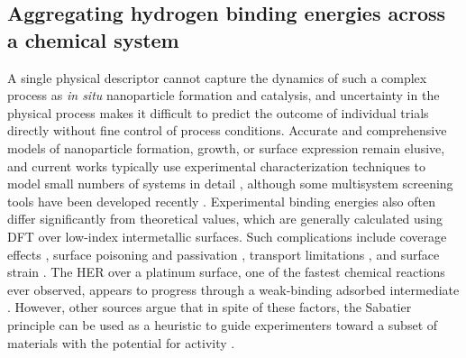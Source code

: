 \documentclass[preprint,12pt]{elsarticle}
\begin{document}
\subsection{Aggregating hydrogen binding energies across a chemical system}
A single physical descriptor cannot capture the dynamics of such a complex process as {\it in situ} nanoparticle formation and catalysis, and uncertainty in the physical process makes it difficult to predict the outcome of individual trials directly without fine control of process conditions. Accurate and comprehensive models of nanoparticle formation, growth, or surface expression remain elusive, and current works typically use experimental characterization techniques to model small numbers of systems in detail \cite{chen2019kinetics,ma2019toward,gamler2019achieving}, although some multisystem screening tools have been developed recently \cite{wahl2021machine,li2019intermetallic,palizhati2019toward}. Experimental binding energies also often differ significantly from theoretical values, which are generally calculated using DFT over low-index intermetallic surfaces. Such complications include coverage effects \cite{frey2014implications}, surface poisoning and passivation \cite{quaino2014volcano}, transport limitations \cite{rheinlander2013comparing}, and surface strain \cite{khorshidi2018strain}. The HER over a platinum surface, one of the fastest chemical reactions ever observed, appears to progress through a weak-binding adsorbed intermediate \cite{lindgren2019challenge,ooka2021non}. However, other sources argue that in spite of these factors, the Sabatier principle can be used as a heuristic to guide experimenters toward a subset of materials with the potential for activity \cite{ulissi2011effect,schipper2018effects}. 
\end{document}
